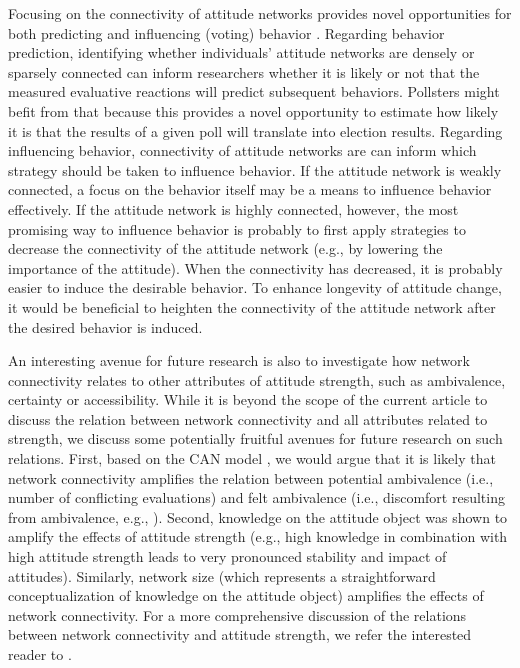 \documentclass[10pt]{article}
\begin{document}
\begin{multicols}{2}
Focusing on the connectivity of attitude networks provides novel opportunities for both predicting and influencing (voting) behavior \cite<see also> {Dalege2017}. Regarding behavior prediction, identifying whether individuals' attitude networks are densely or sparsely connected can inform researchers whether it is likely or not that the measured evaluative reactions will predict subsequent behaviors. Pollsters might befit from that because this provides a novel opportunity to estimate how likely it is that the results of a given poll will translate into election results. Regarding influencing behavior, connectivity of attitude networks are can inform which strategy should be taken to influence behavior. If the attitude network is weakly connected, a focus on the behavior itself may be a means to influence behavior effectively. If the attitude network is highly connected, however, the most promising way to influence behavior is probably to first apply strategies to decrease the connectivity of the attitude network (e.g., by lowering the importance of the attitude). When the connectivity has decreased, it is probably easier to induce the desirable behavior. To enhance longevity of attitude change, it would be beneficial to heighten the connectivity of the attitude network after the desired behavior is induced.\par
An interesting avenue for future research is also to investigate how network connectivity relates to other attributes of attitude strength, such as ambivalence, certainty or accessibility. While it is beyond the scope of the current article to discuss the relation between network connectivity and all attributes related to strength, we discuss some potentially fruitful avenues for future research on such relations. First, based on the CAN model \cite{Dalege2016}, we would argue that it is likely that network connectivity amplifies the relation between potential ambivalence (i.e., number of conflicting evaluations) and felt ambivalence (i.e., discomfort resulting from ambivalence, e.g., ). Second, knowledge on the attitude object was shown to amplify the effects of attitude strength (e.g., high knowledge in combination with high attitude strength leads to very pronounced stability and impact of attitudes). Similarly, network size (which represents a straightforward conceptualization of knowledge on the attitude object) amplifies the effects of network connectivity. For a more comprehensive discussion of the relations between network connectivity and attitude strength, we refer the interested reader to .

\end{multicols}
\end{document}
